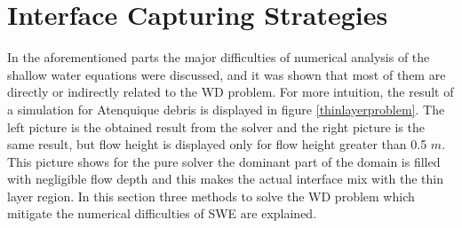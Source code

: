 \documentclass[review]{elsarticle}
\begin{document}
\section{Interface Capturing Strategies}\label{solution}
In the aforementioned parts the major difficulties of numerical analysis of the shallow water
equations were discussed, and it was shown that most of them are directly or indirectly related to the WD problem.
For more intuition, the result of a simulation for Atenquique debris is displayed in figure \ref{thinlayerproblem}. 
The left picture is the obtained result from the solver and the right picture is the same result, but flow height is displayed 
only for flow height greater than 0.5 $m$. This picture shows for the pure solver the dominant part of the 
domain is filled with negligible flow depth and this makes the actual interface mix with the thin layer region.
In this section three methods to solve the WD problem which mitigate the numerical difficulties of SWE are explained. 
\end{document}
